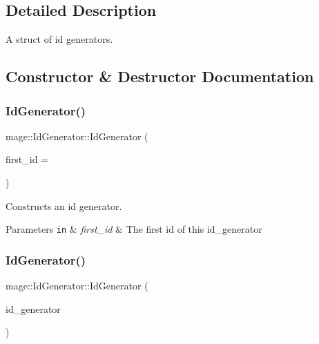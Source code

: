 \subsection{Detailed Description}
A struct of id generators. 

\subsection{Constructor \& Destructor Documentation}
\hypertarget{structmage_1_1_id_generator_a59392d3cbba77c323c467fffb539f630}{}\label{structmage_1_1_id_generator_a59392d3cbba77c323c467fffb539f630} 
\subsubsection{\texorpdfstring{Id\+Generator()}{IdGenerator()}\hspace{0.1cm}{\footnotesize\ttfamily [1/3]}}
{\footnotesize\ttfamily mage\+::\+Id\+Generator\+::\+Id\+Generator (\begin{DoxyParamCaption}\item[{\hyperlink{namespacemage_a642e05c5c83642b6946703615cdbf2da}{S32}}]{first\+\_\+id = {} }\end{DoxyParamCaption})\hspace{0.3cm}{\ttfamily [explicit]}}

Constructs an id generator.


\begin{DoxyParams}[1]{Parameters}
\mbox{\tt in}  & {\em first\+\_\+id} & The first id of this id\+\_\+generator \\
\hline
\end{DoxyParams}
\hypertarget{structmage_1_1_id_generator_a6f502d2cd8b63e7c76f31834b028a11d}{}\label{structmage_1_1_id_generator_a6f502d2cd8b63e7c76f31834b028a11d} 
\subsubsection{\texorpdfstring{Id\+Generator()}{IdGenerator()}\hspace{0.1cm}{\footnotesize\ttfamily [2/3]}}
{\footnotesize\ttfamily mage\+::\+Id\+Generator\+::\+Id\+Generator (\begin{DoxyParamCaption}\item[{const \hyperlink{structmage_1_1_id_generator}{Id\+Generator} \&}]{id\+\_\+generator }\end{DoxyParamCaption})\hspace{0.3cm}{\ttfamily [delete]}}

